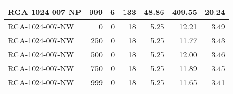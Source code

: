 \begin{table}[htbp]
{\begin{tabular}{lrrrrrr}
    RGA-1024-007-NP & 999    & 6      & 133    & 48.86  & 409.55 & 20.24 \\ \hline
    RGA-1024-007-NW & 0      & 0      & 18     & 5.25   & 12.21  & 3.49 \\
    RGA-1024-007-NW & 250    & 0      & 18     & 5.25   & 11.77  & 3.43 \\
    RGA-1024-007-NW & 500    & 0      & 18     & 5.25   & 12.00  & 3.46 \\
    RGA-1024-007-NW & 750    & 0      & 18     & 5.25   & 11.89  & 3.45 \\
    RGA-1024-007-NW & 999    & 0      & 18     & 5.25   & 11.65  & 3.41 \\
    \bottomrule
    \end{tabular}}
  \label{tab:addlabel}%
\end{table}%
